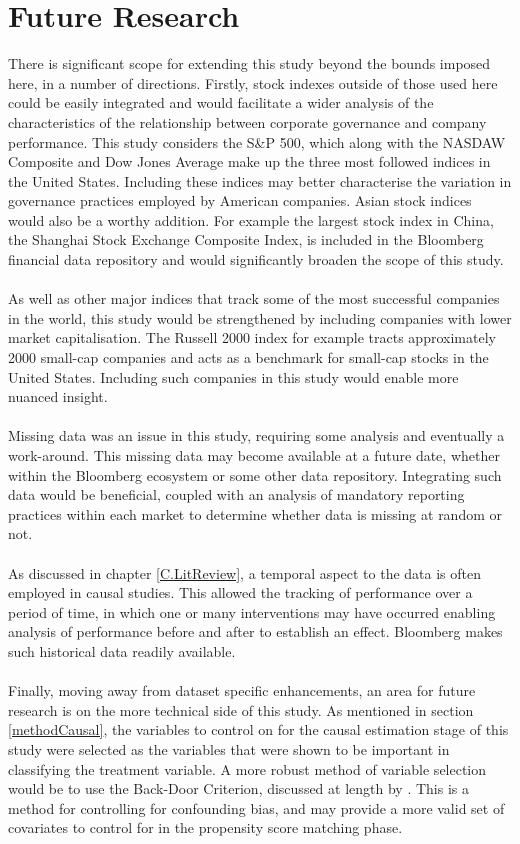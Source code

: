 \section{Future Research}
{There is significant scope for extending this study beyond the bounds imposed here, in a number of directions. Firstly, stock indexes outside of those used here could be easily integrated and would facilitate a wider analysis of the characteristics of the relationship between corporate governance and company performance. This study considers the S\&P 500, which along with the NASDAW Composite and Dow Jones Average make up the three most followed indices in the United States. Including these indices may better characterise the variation in governance practices employed by American companies. Asian stock indices would also be a worthy addition. For example the largest stock index in China, the Shanghai Stock Exchange Composite Index, is included in the Bloomberg financial data repository and would significantly broaden the scope of this study.  \\\\
As well as other major indices that track some of the most successful companies in the world, this study would be strengthened by including companies with lower market capitalisation. The Russell 2000 index for example tracts approximately 2000 small-cap companies and acts as a benchmark for small-cap stocks in the United States. Including such companies in this study would enable more nuanced insight.   \\\\
Missing data was an issue in this study, requiring some analysis and eventually a work-around. This missing data may become available at a future date, whether within the Bloomberg ecosystem or some other data repository. Integrating such data would be beneficial, coupled with an analysis of mandatory reporting practices within each market to determine whether data is missing at random or not. \\\\
As discussed in chapter \ref{C.LitReview}, a temporal aspect to the data is often employed in causal studies. This allowed the tracking of performance over a period of time, in which one or many interventions may have occurred enabling analysis of performance before and after to establish an effect. Bloomberg makes such historical data readily available.\\\\
Finally, moving away from dataset specific enhancements, an area for future research is on the more technical side of this study. As mentioned in section \ref{methodCausal}, the variables to control on for the causal estimation stage of this study were selected as the variables that were shown to be important in classifying the treatment variable. A more robust method of variable selection would be to use the Back-Door Criterion, discussed at length by \cite{pearl2009causality}. This is a method for controlling for confounding bias, and may provide a more valid set of covariates to control for in the propensity score matching phase. }